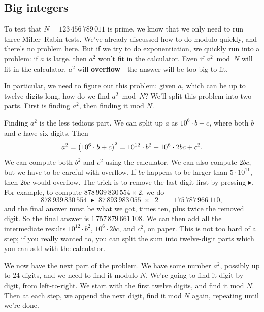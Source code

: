\documentclass[11pt,paper=letter]{scrartcl}
\newcommand{\btn}[1]{\;\boxed{#1}\;}
\begin{document}
\subsection{Big integers}

To test that $N = 123\,456\,789\,011$ is prime, we know that we only need to run three Miller--Rabin tests. We've already discussed how to do modulo quickly, and there's no problem here. But if we try to do exponentiation, we quickly run into a problem: if $a$ is large, then $a^2$ won't fit in the calculator. Even if $a^2 \bmod N$ will fit in the calculator, $a^2$ will \textbf{overflow}---the answer will be too big to fit.

In particular, we need to figure out this problem: given $a$, which can be up to twelve digits long, how do we find $a^2 \bmod N$? We'll split this problem into two parts. First is finding $a^2$, then finding it mod $N$.

Finding $a^2$ is the less tedious part. We can split up $a$ as $10^6 \cdot b + c$, where both $b$ and $c$ have six digits. Then
$$ a^2 = \left( 10^6 \cdot b + c \right)^2 = 10^{12} \cdot b^2 + 10^6 \cdot 2bc + c^2.$$
We can compute both $b^2$ and $c^2$ using the calculator. We can also compute $2bc$, but we have to be careful with overflow. If $bc$ happens to be larger than $5 \cdot 10^{11}$, then $2bc$ would overflow. The trick is to remove the last digit first by pressing $\blacktriangleright$. For example, to compute $878\,939\,830\,554 \times 2$, we do
$$878\,939\,830\,554 \btn{\blacktriangleright} 87\,893\,983\,055 \btn{\times} \btn{2} \btn{=} 175\,787\,966\,110,$$
and the final answer must be what we got, times ten, plus twice the removed digit. So the final answer is $1\,757\,879\,661\,108$. We can then add all the intermediate results $10^{12} \cdot b^2$, $10^6 \cdot 2bc$, and $c^2$, on paper. This is not too hard of a step; if you really wanted to, you can split the sum into twelve-digit parts which you can add with the calculator.

We now have the next part of the problem. We have some number $a^2$, possibly up to $24$ digits, and we need to find it modulo $N$. We're going to find it digit-by-digit, from left-to-right. We start with the first twelve digits, and find it mod $N$. Then at each step, we append the next digit, find it mod $N$ again, repeating until we're done.
\end{document}
